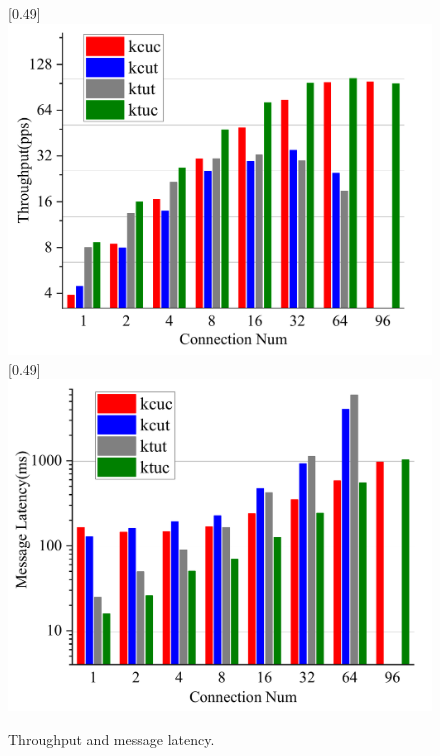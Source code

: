 \documentclass[sigconf,review,anonymous]{acmart}
\begin{document}
\begin{figure}[ht]
    \centering
    [0.49\linewidth]
    {
    \includegraphics[width=\linewidth]{assets/throughput.pdf}
    }
    [0.49\linewidth]
    {
    \includegraphics[width=\linewidth]{assets/latency.pdf}
    }
    \caption{Throughput and message latency.}
    \label{fig:throughput-latency}
\end{figure}
\end{document}
